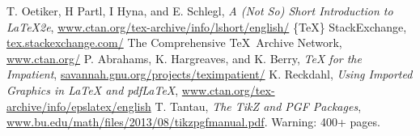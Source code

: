 \begin{thebibliography}{99}

 T. Oetiker, H Partl, I Hyna, and E. Schlegl, \textit{A (Not So) Short Introduction to \LaTeX2e}, \url{www.ctan.org/tex-archive/info/lshort/english/}
 \{\TeX\} StackExchange, \url{tex.stackexchange.com/}
 The Comprehensive \TeX\ Archive Network, \url{www.ctan.org/}
 P. Abrahams, K. Hargreaves, and K. Berry, \textit{TeX for the Impatient}, \url{savannah.gnu.org/projects/teximpatient/}
 K. Reckdahl, \textit{Using Imported Graphics in LaTeX and pdfLaTeX}, \url{www.ctan.org/tex-archive/info/epslatex/english}
 T. Tantau, \textit{The TikZ and PGF Packages}, \url{www.bu.edu/math/files/2013/08/tikzpgfmanual.pdf}. Warning: 400+ pages.
\end{thebibliography}